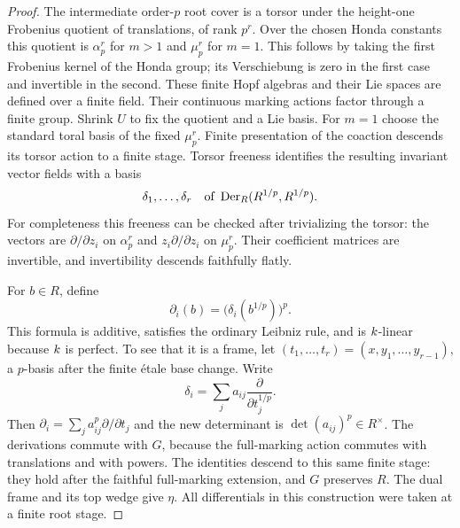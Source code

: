\begin{proof}
The intermediate order-$p$ root cover is a torsor under the height-one
Frobenius quotient of translations, of rank $p^r$.  Over the chosen
Honda constants this quotient is $\alpha_p^r$ for $m>1$ and $\mu_p^r$
for $m=1$.  This follows by taking the first Frobenius kernel of the
Honda group; its Verschiebung is zero in the first case and invertible
in the second.  These finite Hopf algebras and their Lie spaces are
defined over a finite field.  Their continuous marking actions factor
through a finite group.  Shrink $U$ to fix the quotient and a Lie basis.
For $m=1$ choose the standard toral basis of the fixed $\mu_p^r$.
Finite presentation of the coaction descends its torsor action to a
finite stage.  Torsor freeness identifies the resulting invariant
vector fields with a basis
\[
 \delta_1,\ldots,\delta_r
 \quad\hbox{of }\operatorname{Der}_R(R^{1/p},R^{1/p}).
\]
For completeness this freeness can be checked after trivializing the
torsor: the vectors are $\partial/\partial z_i$ on $\alpha_p^r$ and
$z_i\partial/\partial z_i$ on $\mu_p^r$.  Their coefficient matrices
are invertible, and invertibility descends faithfully flatly.

For $b\in R$, define
\begin{equation}
 \partial_i(b)=\bigl(\delta_i(b^{1/p})\bigr)^p.
 \label{eq:trans-frame}
\end{equation}
This formula is additive, satisfies the ordinary Leibniz rule, and is
$k$-linear because $k$ is perfect.  To see that it is a frame, let
$(t_1,\ldots,t_r)=(x,y_1,\ldots,y_{r-1})$, a $p$-basis after the
finite \'{e}tale base change.  Write
\[
 \delta_i=\sum_j a_{ij}\frac{\partial}{\partial t_j^{1/p}}.
\]
Then $\partial_i=\sum_j a_{ij}^p\partial/\partial t_j$ and the new
determinant is $\det(a_{ij})^p\in R^\times$.  The derivations commute
with $G$, because the full-marking action commutes with translations
and with powers.  The identities descend to this same finite stage:
they hold after the faithful full-marking extension, and $G$ preserves
$R$.  The dual frame and its top wedge give $\eta$.  All differentials
in this construction were taken at a finite root stage.


\end{proof}
